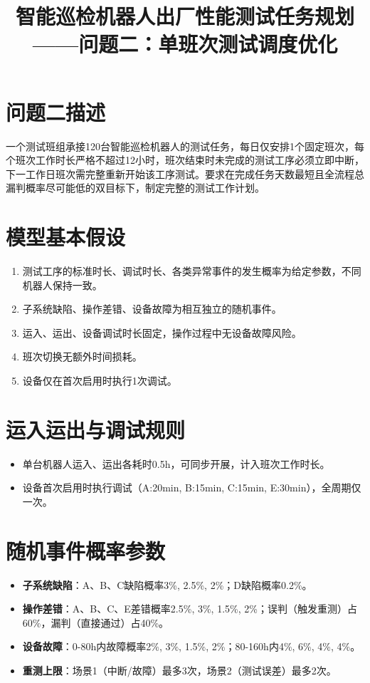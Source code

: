 \documentclass{article}
\title{智能巡检机器人出厂性能测试任务规划\\ ——问题二：单班次测试调度优化}
\author{}
\date{}
\begin{document}
\maketitle

\section{问题二描述}
一个测试班组承接120台智能巡检机器人的测试任务，每日仅安排1个固定班次，每个班次工作时长严格不超过12小时，班次结束时未完成的测试工序必须立即中断，下一工作日班次需完整重新开始该工序测试。要求在完成任务天数最短且全流程总漏判概率尽可能低的双目标下，制定完整的测试工作计划。

\section{模型基本假设}
\begin{enumerate}
    \item 测试工序的标准时长、调试时长、各类异常事件的发生概率为给定参数，不同机器人保持一致。
    \item 子系统缺陷、操作差错、设备故障为相互独立的随机事件。
    \item 运入、运出、设备调试时长固定，操作过程中无设备故障风险。
    \item 班次切换无额外时间损耗。
    \item 设备仅在首次启用时执行1次调试。
\end{enumerate}

\section{运入运出与调试规则}
\begin{itemize}
    \item 单台机器人运入、运出各耗时0.5h，可同步开展，计入班次工作时长。
    \item 设备首次启用时执行调试（A:20min, B:15min, C:15min, E:30min），全周期仅一次。
\end{itemize}

\section{随机事件概率参数}
\begin{itemize}
    \item \textbf{子系统缺陷}：A、B、C缺陷概率3\%, 2.5\%, 2\%；D缺陷概率0.2\%。
    \item \textbf{操作差错}：A、B、C、E差错概率2.5\%, 3\%, 1.5\%, 2\%；误判（触发重测）占60\%，漏判（直接通过）占40\%。
    \item \textbf{设备故障}：0-80h内故障概率2\%, 3\%, 1.5\%, 2\%；80-160h内4\%, 6\%, 4\%, 4\%。
    \item \textbf{重测上限}：场景1（中断/故障）最多3次，场景2（测试误差）最多2次。
\end{itemize}
\end{document}
